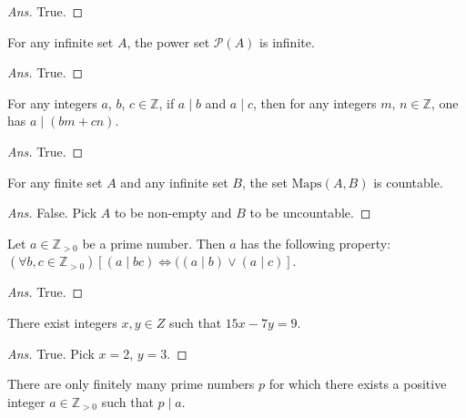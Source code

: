 \documentclass[12pt]{article}
\newenvironment{problem}[2][Problem]{\begin{trivlist}
\item[\hskip \labelsep {\bfseries #1}\hskip \labelsep {\bfseries #2.}]}{\end{trivlist}}
\begin{document}
\begin{proof}[Ans]
True.
\end{proof}

\begin{problem}{21}
 For any infinite set $A$, the power set $\mathcal{P}(A)$ is infinite.

\end{problem}

\begin{proof}[Ans]
True.
\end{proof}

\begin{problem}{22}
For any integers $a$, $b$, $c \in \mathbb{Z}$, if $a \mid b$ and $a \mid c$,
then for any integers $m$, $n \in \mathbb{Z}$, one has $a \mid (bm+cn)$.
\end{problem}

\begin{proof}[Ans]
True.
\end{proof}

\begin{problem}{23}
For any finite set $A$ and any infinite set $B$,
the set $\text{Maps}(A, B)$ is countable.
\end{problem}

\begin{proof}[Ans]
False. Pick $A$ to be non-empty and $B$ to be uncountable.
\end{proof}

\begin{problem}{24}
Let $a \in \mathbb{Z}_{>0}$ be a prime number. Then $a$ has the following property:
$(\forall b, c \in \mathbb{Z}_{>0})\left[(a \mid bc) 
\Leftrightarrow ((a \mid b) \lor (a \mid c) \right]$.

\end{problem}

\begin{proof}[Ans]
True. 
\end{proof}

\begin{problem}{25}
There exist integers $x, y \in Z$ such that $15x - 7y = 9$.
\end{problem}

\begin{proof}[Ans]
True. Pick $x = 2$, $y = 3$.
\end{proof}

\begin{problem}{26}
There are only finitely many prime numbers $p$ for which
there exists a positive integer $a \in \mathbb{Z}_{>0}$ such that $p \mid a$.
\end{problem}
\end{document}
